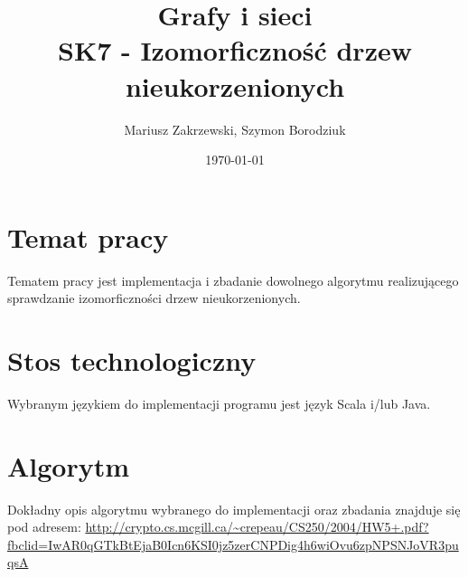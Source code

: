 \documentclass[12pt]{article}%
\begin{document}
\title{Grafy i sieci\\
    \large SK7 - Izomorficzność drzew nieukorzenionych}
\author{Mariusz Zakrzewski, Szymon Borodziuk}
\date{\today}
\maketitle

\section{Temat pracy}

Tematem pracy jest implementacja i zbadanie dowolnego algorytmu realizującego sprawdzanie izomorficzności drzew nieukorzenionych.

\section{Stos technologiczny}

Wybranym językiem do implementacji programu jest język Scala i/lub Java.

\section{Algorytm}

Dokładny opis algorytmu wybranego do implementacji oraz zbadania znajduje się pod adresem: \url{http://crypto.cs.mcgill.ca/~crepeau/CS250/2004/HW5+.pdf?fbclid=IwAR0qGTkBtEjaB0Icn6KSI0jz5zerCNPDig4h6wiOvu6zpNPSNJoVR3puqsA}
\end{document}
